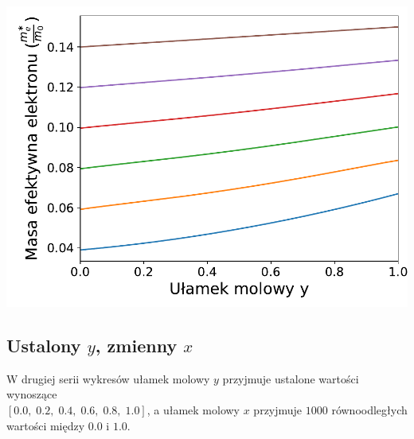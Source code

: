 \documentclass[12pt,openany,a4paper]{book}
\begin{document}
\begin{center}
\begin{minipage}[t]{0.5\textwidth}
	\includegraphics[width = \linewidth]{Figures/quaternary/quat_m_e_x.pdf}\label{fig:quat_me_x}
\end{minipage}
\end{center}

\subsection{Ustalony \(y\), zmienny \(x\)}
W drugiej serii wykresów ułamek molowy \(y\) przyjmuje ustalone
wartości wynoszące\\
\([0.0,\;0.2,\; 0.4,\; 0.6,\; 0.8,\; 1.0]\), a ułamek molowy \(x\)
przyjmuje \(1000\) równoodległych wartości między \(0.0\) i \(1.0\). 
\end{document}
